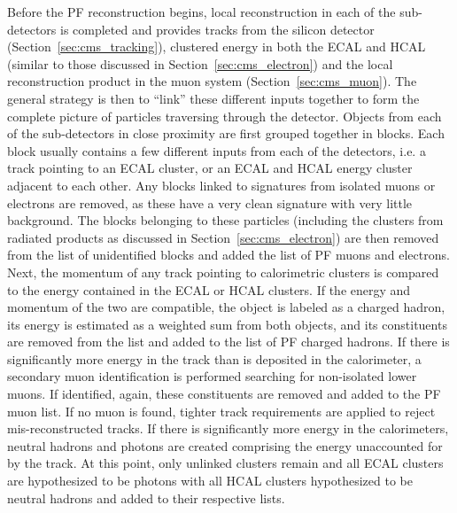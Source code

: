 Before the PF reconstruction begins, local reconstruction in each of the
sub-detectors is completed and provides tracks from the silicon detector
(Section~\ref{sec:cms_tracking}), clustered energy in both the ECAL and HCAL
(similar to those discussed in Section~\ref{sec:cms_electron}) and the local
reconstruction product in the muon system (Section~\ref{sec:cms_muon}). The
general strategy is then to ``link'' these different inputs together to form
the complete picture of particles traversing through the detector. Objects
from each of the sub-detectors in close proximity are first grouped together
in blocks. Each block usually contains a few different inputs from each of the
detectors, i.e. a track pointing to an ECAL cluster, or an ECAL and HCAL energy
cluster adjacent to each other. Any blocks linked to signatures from isolated
muons or electrons are removed, as these have a very clean signature with very
little background. The blocks belonging to these particles (including the
clusters from radiated products as discussed in Section~\ref{sec:cms_electron})
are then removed from the list of unidentified blocks and added the list of PF
muons and electrons. Next, the momentum of any track pointing to calorimetric
clusters is compared to the energy contained in the ECAL or HCAL clusters.
If the energy and momentum of the two are compatible, the object is labeled
as a charged hadron, its energy is estimated as a weighted sum from both
objects, and its constituents are removed from the list and added to the list
of PF charged hadrons. If there is significantly more energy in the track
than is deposited in the calorimeter, a secondary muon identification is
performed searching for non-isolated lower \pt muons. If identified, again,
these constituents are removed and added to the PF muon list. If no muon is
found, tighter track requirements are applied to reject mis-reconstructed
tracks. If there is significantly more energy in the calorimeters, neutral
hadrons and photons are created comprising the energy unaccounted for by the
track. At this point, only unlinked clusters remain and all ECAL clusters are
hypothesized to be photons with all HCAL clusters hypothesized to be neutral
hadrons and added to their respective lists.


